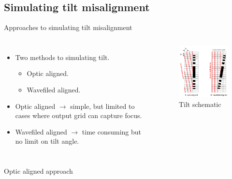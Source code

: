 \documentclass{beamer}
\begin{document}
\subsection{Simulating tilt misalignment}
\begin{frame}{Approaches to simulating tilt misalignment}
	\begin{block}{}
		\begin{columns}[onlytextwidth,T]
			\column{\dimexpr\linewidth-30mm-10mm}
			\begin{itemize}
				\item Two methods to simulating tilt.
				\begin{itemize}
					\item Optic aligned.
					\item Wavefiled aligned.
				\end{itemize}
			\item Optic aligned $\rightarrow$ simple, but limited to cases where output grid can capture focus.	
			\item Wavefiled aligned $\rightarrow $ time consuming but no limit on tilt angle.
			\end{itemize}
			\column{30mm}
			\begin{figure}
				\vspace*{-1cm}\hspace*{-1.25cm}\includegraphics[width=50mm]{tilted_zp_grids}
				\caption{Tilt schematic}
			\end{figure}
		\end{columns}
	\end{block}
\end{frame}


\begin{frame}{Optic aligned approach}


\end{frame}
\end{document}
